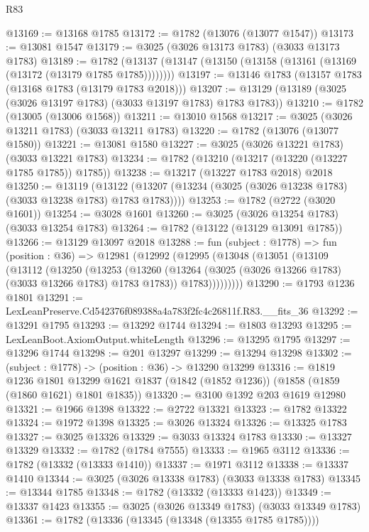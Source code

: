 \begin{lexlean}{R83}
\begin{coremodule}
@13169 := @13168 @1785
@13172 := @1782 (@13076 (@13077 @1547))
@13173 := @13081 @1547
@13179 := @3025 (@3026 @13173 @1783) (@3033 @13173 @1783)
@13189 := @1782 (@13137 (@13147 (@13150 (@13158 (@13161 (@13169 (@13172 (@13179 @1785 @1785))))))))
@13197 := @13146 @1783 (@13157 @1783 (@13168 @1783 (@13179 @1783 @2018)))
@13207 := @13129 (@13189 (@3025 (@3026 @13197 @1783) (@3033 @13197 @1783) @1783 @1783))
@13210 := @1782 (@13005 (@13006 @1568))
@13211 := @13010 @1568
@13217 := @3025 (@3026 @13211 @1783) (@3033 @13211 @1783)
@13220 := @1782 (@13076 (@13077 @1580))
@13221 := @13081 @1580
@13227 := @3025 (@3026 @13221 @1783) (@3033 @13221 @1783)
@13234 := @1782 (@13210 (@13217 (@13220 (@13227 @1785 @1785)) @1785))
@13238 := @13217 (@13227 @1783 @2018) @2018
@13250 := @13119
    (@13122 (@13207 (@13234 (@3025 (@3026 @13238 @1783) (@3033 @13238 @1783) @1783 @1783))))
@13253 := @1782 (@2722 (@3020 @1601))
@13254 := @3028 @1601
@13260 := @3025 (@3026 @13254 @1783) (@3033 @13254 @1783)
@13264 := @1782 (@13122 (@13129 @13091 @1785))
@13266 := @13129 @13097 @2018
@13288 := fun (subject : @1778) =>
  fun (position : @36) =>
  @12981
    (@12992
      (@12995
        (@13048
          (@13051
            (@13109
              (@13112
                (@13250
                  (@13253
                    (@13260
                      (@13264 (@3025 (@3026 @13266 @1783) (@3033 @13266 @1783) @1783 @1783))
                      @1783)))))))))
@13290 := @1793 @1236 @1801
@13291 := LexLeanPreserve.Cd542376f089388a4a783f2fc4c26811f.R83.__fits_36
@13292 := @13291 @1795
@13293 := @13292 @1744
@13294 := @1803 @13293
@13295 := LexLeanBoot.AxiomOutput.whiteLength
@13296 := @13295 @1795
@13297 := @13296 @1744
@13298 := @201 @13297
@13299 := @13294 @13298
@13302 := (subject : @1778) -> (position : @36) -> @13290 @13299
@13316 := @1819
    @1236
    @1801
    @13299
    @1621
    @1837
    (@1842 (@1852 @1236))
    (@1858 (@1859 (@1860 @1621) @1801 @1835))
@13320 := @3100 @1392 @203 @1619 @12980
@13321 := @1966 @1398
@13322 := @2722 @13321
@13323 := @1782 @13322
@13324 := @1972 @1398
@13325 := @3026 @13324
@13326 := @13325 @1783
@13327 := @3025 @13326
@13329 := @3033 @13324 @1783
@13330 := @13327 @13329
@13332 := @1782 (@1784 @7555)
@13333 := @1965 @3112
@13336 := @1782 (@13332 (@13333 @1410))
@13337 := @1971 @3112
@13338 := @13337 @1410
@13344 := @3025 (@3026 @13338 @1783) (@3033 @13338 @1783)
@13345 := @13344 @1785
@13348 := @1782 (@13332 (@13333 @1423))
@13349 := @13337 @1423
@13355 := @3025 (@3026 @13349 @1783) (@3033 @13349 @1783)
@13361 := @1782 (@13336 (@13345 (@13348 (@13355 @1785 @1785))))

\end{coremodule}
\end{lexlean}
